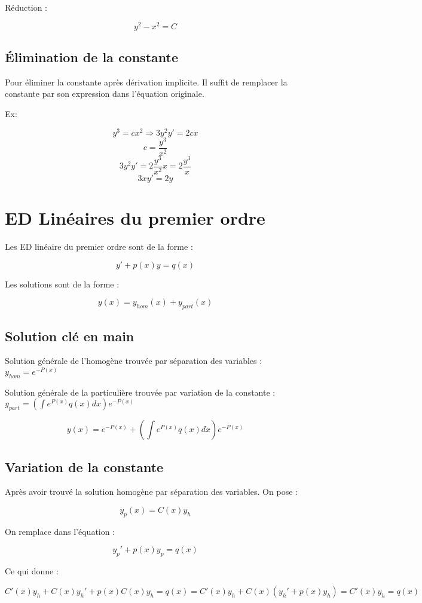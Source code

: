 \documentclass[12pt,a4paper]{report}
\begin{document}
Réduction :

$$y^2 - x^2 = C$$

\subsection{Élimination de la constante}

Pour éliminer la constante après dérivation implicite. Il suffit de remplacer la constante par son expression dans l'équation originale.

Ex:

$$y^3 = cx^2 \Rightarrow 3y^2y' = 2cx$$
$$c = \frac{y^3}{x^2}$$
$$3y^2y' = 2\frac{y^3}{x^2}x = 2\frac{y^3}{x}$$
$$3xy' = 2y$$

\section{ED Linéaires du premier ordre}

Les ED linéaire du premier ordre sont de la forme :

$$y' + p(x)y = q(x)$$

Les solutions sont de la forme :

$$y(x) = y_{hom}(x) + y_{part}(x)$$

\subsection{Solution clé en main}


Solution générale de l'homogène trouvée par séparation des variables : $y_{hom} = e^{-P(x)}$

Solution générale de la particulière trouvée par variation de la constante : $y_{part} = \left( \int e^{P(x)} q(x) dx \right) e^{-P(x)}$

$$y(x) = e^{-P(x)} + \left( \int e^{P(x)} q(x) dx \right) e^{-P(x)}$$

\subsection{Variation de la constante}

Après avoir trouvé la solution homogène par séparation des variables. On pose :

$$ y_p(x) = C(x) y_h$$

On remplace dans l'équation :

$$y_p' + p(x)y_p = q(x)$$

Ce qui donne :

$$C'(x)y_h + C(x)y_h' + p(x)C(x)y_h = q(x) =C'(x)y_h + C(x)(y_h' + p(x)y_h) = C'(x)y_h = q(x)$$
\end{document}
